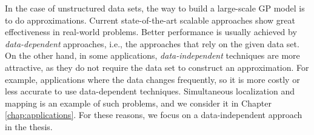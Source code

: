 In the case of unstructured data sets, the way to build a large-scale GP model
is to do approximations.
Current state-of-the-art scalable approaches show great effectiveness in real-world
problems.
Better performance is usually achieved by {\em data-dependent} approaches, i.e.,
the approaches that rely on the given data set.
On the other hand, in some applications, {\em data-independent} techniques are more attractive, as
they do not require the data set to construct an approximation.
For example, applications where the data changes frequently, so it is more costly
or less accurate to use data-dependent techniques.
Simultaneous localization and mapping is an example of such problems, and we consider it in Chapter \ref{chap:applications}.
For these reasons, we focus on a data-independent approach in the thesis.




